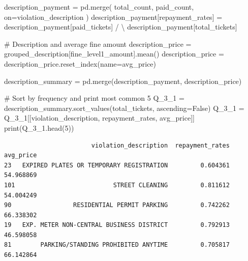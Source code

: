 \documentclass[
  letterpaper,
  DIV=11,
  numbers=noendperiod]{scrartcl}
\newenvironment{Shaded}{\begin{snugshade}}{\end{snugshade}}
\newcommand{\BuiltInTok}[1]{\textcolor[rgb]{0.00,0.23,0.31}{#1}}
\newcommand{\CommentTok}[1]{\textcolor[rgb]{0.37,0.37,0.37}{#1}}
\newcommand{\DecValTok}[1]{\textcolor[rgb]{0.68,0.00,0.00}{#1}}
\newcommand{\NormalTok}[1]{\textcolor[rgb]{0.00,0.23,0.31}{#1}}
\newcommand{\OperatorTok}[1]{\textcolor[rgb]{0.37,0.37,0.37}{#1}}
\newcommand{\StringTok}[1]{\textcolor[rgb]{0.13,0.47,0.30}{#1}}
\newcommand{\VariableTok}[1]{\textcolor[rgb]{0.07,0.07,0.07}{#1}}
\begin{document}
\begin{Shaded}
\begin{Highlighting}[]
\NormalTok{description\_payment }\OperatorTok{=}\NormalTok{ pd.merge(}
\NormalTok{    total\_count, paid\_count, }
\NormalTok{    on}\OperatorTok{=}\StringTok{\textquotesingle{}violation\_description\textquotesingle{}}
\NormalTok{    )}
\NormalTok{description\_payment[}\StringTok{\textquotesingle{}repayment\_rates\textquotesingle{}}\NormalTok{] }\OperatorTok{=}\NormalTok{ description\_payment[}\StringTok{\textquotesingle{}paid\_tickets\textquotesingle{}}\NormalTok{] }\OperatorTok{/} \OperatorTok{\textbackslash{}}
\NormalTok{                                         description\_payment[}\StringTok{\textquotesingle{}total\_tickets\textquotesingle{}}\NormalTok{]}

\CommentTok{\# Description and average fine amount}
\NormalTok{description\_price }\OperatorTok{=}\NormalTok{ grouped\_description[}\StringTok{\textquotesingle{}fine\_level1\_amount\textquotesingle{}}\NormalTok{].mean()}
\NormalTok{description\_price }\OperatorTok{=}\NormalTok{ description\_price.reset\_index(name}\OperatorTok{=}\StringTok{\textquotesingle{}avg\_price\textquotesingle{}}\NormalTok{)}

\NormalTok{description\_summary }\OperatorTok{=}\NormalTok{ pd.merge(description\_payment, description\_price)}

\CommentTok{\# Sort by frequency and print most common 5}
\NormalTok{Q\_3\_1 }\OperatorTok{=}\NormalTok{ description\_summary.sort\_values(}\StringTok{\textquotesingle{}total\_tickets\textquotesingle{}}\NormalTok{, ascending}\OperatorTok{=}\VariableTok{False}\NormalTok{)}
\NormalTok{Q\_3\_1 }\OperatorTok{=}\NormalTok{ Q\_3\_1[[}\StringTok{\textquotesingle{}violation\_description\textquotesingle{}}\NormalTok{, }\StringTok{\textquotesingle{}repayment\_rates\textquotesingle{}}\NormalTok{, }\StringTok{\textquotesingle{}avg\_price\textquotesingle{}}\NormalTok{]]}
\BuiltInTok{print}\NormalTok{(Q\_3\_1.head(}\DecValTok{5}\NormalTok{))}
\end{Highlighting}
\end{Shaded}

\begin{verbatim}
                        violation_description  repayment_rates  avg_price
23   EXPIRED PLATES OR TEMPORARY REGISTRATION         0.604361  54.968869
101                           STREET CLEANING         0.811612  54.004249
90                 RESIDENTIAL PERMIT PARKING         0.742262  66.338302
19   EXP. METER NON-CENTRAL BUSINESS DISTRICT         0.792913  46.598058
81        PARKING/STANDING PROHIBITED ANYTIME         0.705817  66.142864
\end{verbatim}
\end{document}
